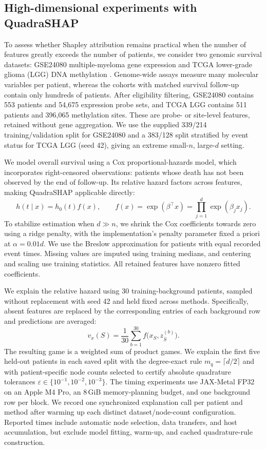 \subsection{High-dimensional experiments with QuadraSHAP}
\label{sec:high-dimensional-quadrashap}

To assess whether Shapley attribution remains practical when the number of
features greatly exceeds the number of patients, we consider two genomic
survival datasets: GSE24080 multiple-myeloma gene expression
\cite{geo_gse24080} and TCGA lower-grade glioma (LGG) DNA methylation
\cite{tcga_lgg_methylation}.
Genome-wide assays measure many molecular variables per patient, whereas
the cohorts with matched survival follow-up contain only hundreds of patients.
After eligibility filtering, GSE24080 contains 553 patients and 54,675
expression probe sets, and TCGA LGG contains 511 patients and 396,065
methylation sites. These are probe- or site-level features, retained without
gene aggregation. We use the supplied 339/214 training/validation split
for GSE24080 and a 383/128 split stratified by event status for TCGA LGG
(seed 42), giving an extreme small-$n$, large-$d$ setting.

We model overall survival using a Cox proportional-hazards model, which
incorporates right-censored observations: patients whose death has not been
observed by the end of follow-up. Its relative hazard factors across features,
making QuadraSHAP applicable directly:
\[
h(t\mid x)=h_0(t)f(x),
\qquad
f(x)=\exp(\beta^\top x)=\prod_{j=1}^{d}\exp(\beta_jx_j).
\]
To stabilize estimation when $d\gg n$, we shrink the Cox coefficients
towards zero using a ridge penalty, with the implementation's penalty
parameter fixed a priori at $\alpha=0.01d$. We use the Breslow approximation
for patients with equal recorded event times. Missing values are imputed using
training medians, and centering and scaling use training statistics.
All retained features have nonzero fitted coefficients.

We explain the relative hazard using 30 training-background patients,
sampled without replacement with seed 42 and held fixed across methods.
Specifically, absent features are replaced by the corresponding entries
of each background row and predictions are averaged:
\[
v_x(S)=\frac{1}{30}\sum_{b=1}^{30}
f\bigl(x_S,z^{(b)}_{\overline S}\bigr).
\]
The resulting game is a weighted sum of product games. We explain the
first five held-out patients in each saved split with the degree-exact rule
$m_q=\lceil d/2\rceil$ and with patient-specific node counts selected
to certify absolute quadrature tolerances
$\varepsilon\in\{10^{-1},10^{-2},10^{-3}\}$.
The timing experiments use JAX-Metal FP32 on an Apple M4 Pro, an 8\,GiB memory-planning
budget, and one background row per block. We record one synchronized
explanation call per patient and method after warming up each distinct
dataset/node-count configuration. Reported times include automatic node
selection, data transfers, and host accumulation, but exclude model fitting,
warm-up, and cached quadrature-rule construction.

